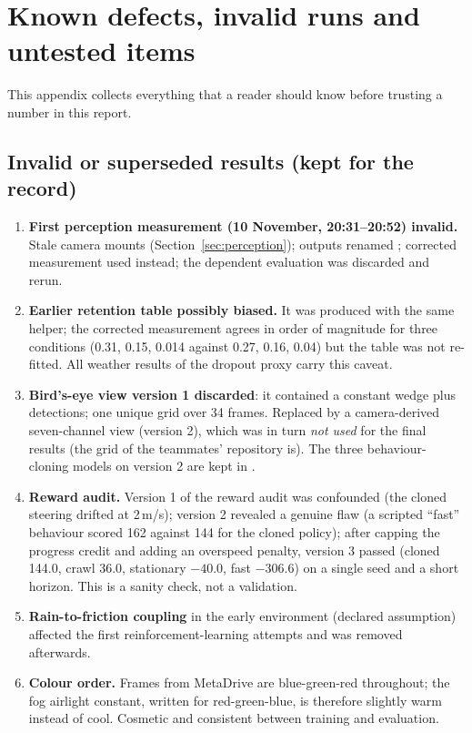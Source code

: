 \section{Known defects, invalid runs and untested items}\label{app:honesty}

This appendix collects everything that a reader should know before trusting a number in this report.

\subsection{Invalid or superseded results (kept for the record)}
\begin{enumerate}
\item \textbf{First perception measurement (10 November, 20:31--20:52) invalid.} Stale camera mounts (Section~\ref{sec:perception}); outputs renamed ; corrected measurement used instead; the dependent  evaluation was discarded and rerun.
\item \textbf{Earlier retention table possibly biased.} It was produced with the same helper; the corrected measurement agrees in order of magnitude for three conditions (0.31, 0.15, 0.014 against 0.27, 0.16, 0.04) but the table was not re-fitted. All weather results of the dropout proxy carry this caveat.
\item \textbf{Bird's-eye view version 1 discarded}: it contained a constant wedge plus detections; one unique grid over 34 frames. Replaced by a camera-derived seven-channel view (version 2), which was in turn \emph{not used} for the final results (the grid of the teammates' repository is). The three behaviour-cloning models on version 2 are kept in .
\item \textbf{Reward audit.} Version 1 of the reward audit was confounded (the cloned steering drifted at 2\,m/s); version 2 revealed a genuine flaw (a scripted ``fast'' behaviour scored 162 against 144 for the cloned policy); after capping the progress credit and adding an overspeed penalty, version 3 passed (cloned 144.0, crawl 36.0, stationary $-40.0$, fast $-306.6$) on a single seed and a short horizon. This is a sanity check, not a validation.
\item \textbf{Rain-to-friction coupling} in the early environment (declared assumption) affected the first reinforcement-learning attempts and was removed afterwards.
\item \textbf{Colour order.} Frames from MetaDrive are blue-green-red throughout; the fog airlight constant, written for red-green-blue, is therefore slightly warm instead of cool. Cosmetic and consistent between training and evaluation.
\end{enumerate}

